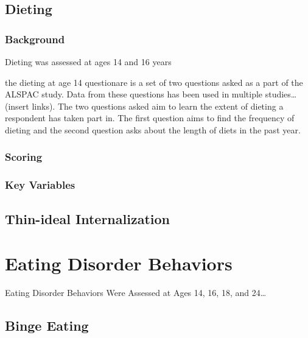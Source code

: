 \documentclass[
]{book}
\begin{document}
\hypertarget{dieting}{%
\section{Dieting}\label{dieting}}

\hypertarget{background}{%
\subsection{Background}\label{background}}

Dieting was assessed at ages 14 and 16 years

the dieting at age 14 questionare is a set of two questions asked as a part of the ALSPAC study. Data from these questions has been used in multiple studies\ldots(insert links). The two questions asked aim to learn the extent of dieting a respondent has taken part in. The first question aims to find the frequency of dieting and the second question asks about the length of diets in the past year.

\hypertarget{scoring-1}{%
\subsection{Scoring}\label{scoring-1}}

\hypertarget{key-variables}{%
\subsection{Key Variables}\label{key-variables}}

\hypertarget{thin-ideal-internalization}{%
\section{Thin-ideal Internalization}\label{thin-ideal-internalization}}

\hypertarget{eating-disorder-behaviors}{%
\chapter{Eating Disorder Behaviors}\label{eating-disorder-behaviors}}

Eating Disorder Behaviors Were Assessed at Ages 14, 16, 18, and 24\ldots{}

\hypertarget{binge-eating}{%
\section{Binge Eating}\label{binge-eating}}
\end{document}
